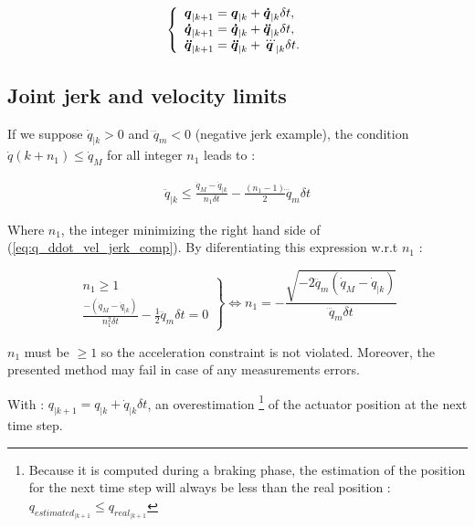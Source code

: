 \documentclass[a4paper, 10pt, conference]{ieeeconf}      %
\newcommand{\vect}[1]{\mbox{\boldmath${#1}$}}%
\begin{document}
{{\begin{equation} 
\left\{\begin{array}{lcl}
\vect{q}_{|k+1} = \vect{q}_{|k} + \vect{\dot{q}}_{|k} \delta t, \\
\vect{\dot{q}}_{|k+1} = \vect{\dot{q}}_{|k} + \vect{\ddot{q}}_{|k} \delta t, \\
\vect{\ddot{q}}_{|k+1} = \vect{\ddot{q}}_{|k} + \vect{\dddot{q}}_{|k} \delta t.
\end{array}\right.
\label{eq:discretized_dynamics}
\end{equation}

\subsection{Joint jerk and velocity limits}


If we suppose $\dot{q}_{|k} > 0$ and $\dddot{q}_m < 0$ (negative jerk example), the condition $\dot{q}(k+n_1) \leq \dot{q}_M$ for all integer $n_1$ leads to :

\begin{equation}
\begin{split}
\ddot{q}_{|k} \leq \frac{\dot{q}_M-\dot{q}_{|k}}{n_1 \delta t} - \frac{(n_1-1)}{2} \dddot{q}_m \delta t 
\label{eq:q_ddot_vel_jerk_comp}
\end{split}
\end{equation}

Where $n_1$, the integer minimizing the right hand side of (\ref{eq:q_ddot_vel_jerk_comp}). By diferentiating this expression w.r.t $n_1$ :

\begin{equation} 
\left. \begin{array}{r} 
n_1 \geq 1 \\
\frac{-(\dot{q}_M-\dot{q}_{|k})}{n_1^2 \delta t} - \frac{1}{2} \dddot{q}_m \delta t = 0
\end{array} \right\} 
\Leftrightarrow n_1=-\frac{\sqrt{-2\dddot{q}_m(\dot{q}_M-\dot{q}_{|k})}}{\dddot{q}_m \delta t}
\label{eq:n_1_eq}
\end{equation}

$n_1$ must be $\geq 1$ so the acceleration constraint is not violated. Moreover, the presented method may fail in case of any measurements errors. 

With : $q_{|k+1} = q_{|k}+\dot{q}_{|k} \delta t$, an overestimation \footnote{ Because it is computed during a braking phase, the estimation of the position for the next time step will always be less than the real position : $q_{estimated}_{|k+1} \leq q_{real}_{|k+1}$} of the actuator position at the next time step.

}}
\end{document}
